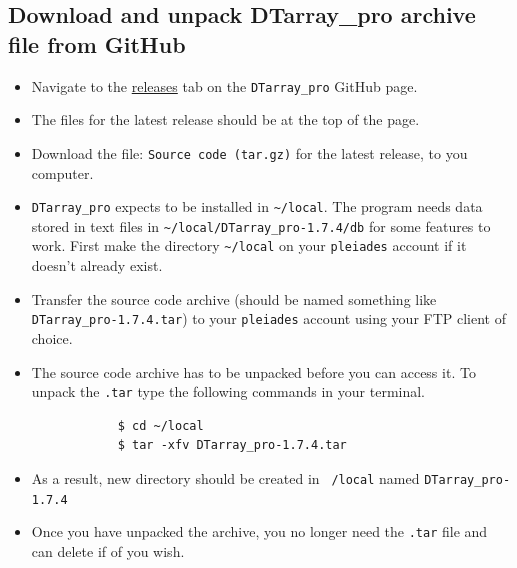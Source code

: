 \documentclass[12pt]{article}
\newcommand{\VERSION}{1.7.4}
\begin{document}
	\subsection{Download and unpack DTarray\_pro archive file from GitHub}
	\begin{itemize}
		\item Navigate to the \href{https://github.com/ajmaurais/DTarray_pro/releases}{releases} tab on the \texttt{DTarray\_pro} GitHub page.
		
		\item The files for the latest release should be at the top of the page.
		
		\item Download the file: \texttt{Source code (tar.gz)} for the latest release, to you computer.
		
		\item \texttt{DTarray\_pro} expects to be installed in \texttt{\textasciitilde/local}. The program needs data stored in text files in \texttt{\textasciitilde/local/DTarray\_pro-\VERSION/db} for some features to work. First make the directory \texttt{\textasciitilde/local} on your \texttt{pleiades} account if it doesn't already exist.
		
		\item Transfer the source code archive (should be named something like \texttt{DTarray\_pro-\VERSION.tar}) to your \texttt{pleiades} account using your FTP client of choice.	
		
		\item The source code archive has to be unpacked before you can access it. To unpack the \texttt{.tar} type the following commands in your terminal.
		
		\begin{lstlisting}
			$ cd ~/local
			$ tar -xfv DTarray_pro-1.7.4.tar
		\end{lstlisting}
		
		\item As a result, new directory should be created in \texttt{~/local} named \texttt{DTarray\_pro-\VERSION}
		
		\item Once you have unpacked the archive, you no longer need the \texttt{.tar} file and can delete if of you wish.
		
	\end{itemize}
\end{document}
